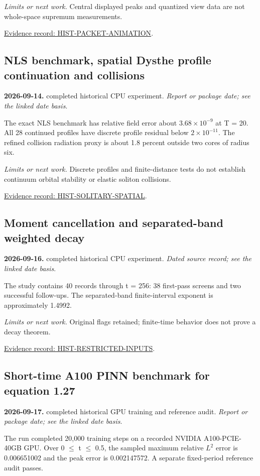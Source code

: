 \documentclass[11pt]{article}
\begin{document}
\noindent\textit{Limits or next work.} Central displayed peaks and quantized view data are not whole-space supremum measurements.

\noindent\href{https://github.com/matasvai/dysthe-paper/blob/codex/research-record-2026-11-05/research-record/2026-11-05/README.md#hist-packet-animation}{Evidence record: HIST-PACKET-ANIMATION}.
\subsection*{NLS benchmark, spatial Dysthe profile continuation and collisions}
\noindent\textbf{2026-09-14.} completed historical CPU experiment. \emph{Report or package date; see the linked date basis}.\par
The exact NLS benchmark has relative field error about $3.68\times 10^{-9}$ at T = 20. All 28 continued profiles have discrete profile residual below $2\times 10^{-11}$. The refined collision radiation proxy is about 1.8 percent outside two cores of radius six.

\noindent\textit{Limits or next work.} Discrete profiles and finite-distance tests do not establish continuum orbital stability or elastic soliton collisions.

\noindent\href{https://github.com/matasvai/dysthe-paper/blob/codex/research-record-2026-11-05/research-record/2026-11-05/README.md#hist-solitary-spatial}{Evidence record: HIST-SOLITARY-SPATIAL}.
\subsection*{Moment cancellation and separated-band weighted decay}
\noindent\textbf{2026-09-16.} completed historical CPU experiment. \emph{Dated source record; see the linked date basis}.\par
The study contains 40 records through t = 256: 38 first-pass screens and two successful follow-ups. The separated-band finite-interval exponent is approximately 1.4992.

\noindent\textit{Limits or next work.} Original flags retained; finite-time behavior does not prove a decay theorem.

\noindent\href{https://github.com/matasvai/dysthe-paper/blob/codex/research-record-2026-11-05/research-record/2026-11-05/README.md#hist-restricted-inputs}{Evidence record: HIST-RESTRICTED-INPUTS}.
\subsection*{Short-time A100 PINN benchmark for equation 1.27}
\noindent\textbf{2026-09-17.} completed historical GPU training and reference audit. \emph{Report or package date; see the linked date basis}.\par
The run completed 20,000 training steps on a recorded NVIDIA A100-PCIE-40GB GPU. Over 0 $\le$ t $\le$ 0.5, the sampled maximum relative $L^2$ error is 0.006651002 and the peak error is 0.002147572. A separate fixed-period reference audit passes.
\end{document}
